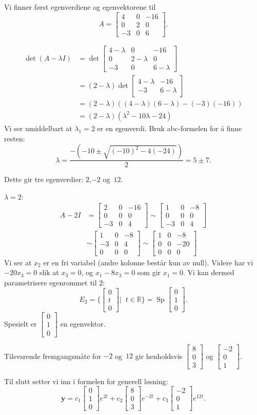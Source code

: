 \documentclass[notitlepage,a4paper,12pt,norsk]{IMFeksamen}
\DeclareMathOperator{\Sp}{Sp}
\newcommand{\V}[1]{\mathbf{#1}}
\newcommand{\vvv}[3]{\begin{bmatrix} #1 \\ #2 \\ #3 \end{bmatrix}}
\newcommand{\0}{\V{0}}
\newcommand{\oppgslutt}{
\begin{center}
\pgfornament[width=6cm]{88}
\end{center}
}
\newenvironment{losning}{\begin{oppgave}}{\oppgslutt\end{oppgave}}
\begin{document}
\begin{losning}
Vi finner først egenverdiene og egenvektorene til
\[A=
\begin{bmatrix}
4 & 0 & -16 \\
0 & 2 & 0 \\
-3 & 0 & 6
\end{bmatrix}.
\]

\begin{align*}
\det (A-\lambda I) &= \det
\begin{bmatrix}
4-\lambda & 0 & -16 \\
0 & 2-\lambda & 0 \\
-3 & 0 & 6-\lambda
\end{bmatrix}\\
&= (2-\lambda)\det
\begin{bmatrix}
4-\lambda & -16 \\
-3 &  6-\lambda
\end{bmatrix}\\
&=(2-\lambda)((4-\lambda)(6-\lambda)-(-3)(-16))\\
&=(2-\lambda)(\lambda ^2-10\lambda-24)
\end{align*}
Vi ser umiddelbart at $\lambda_1=2$ er en egenverdi. Bruk abc-formelen for å finne resten:
$$\lambda=\frac{-(-10\pm \sqrt{(-10)^2-4(-24)})}{2}=5\pm 7.$$

Dette gir tre egenverdier: $2$,$-2$ og~$12$.

\noindent 
$\lambda=2$:
\begin{align*}
A-2I &=
\begin{bmatrix}
2 & 0 & -16 \\
0 & 0 & 0 \\
-3 & 0 & 4
\end{bmatrix}
\sim
\begin{bmatrix}
1 & 0 & -8 \\
0 & 0 & 0 \\
-3 & 0 & 4
\end{bmatrix}\\
&\sim
\begin{bmatrix}
1 & 0 & -8 \\
-3 & 0 & 4 \\
0 & 0 & 0
\end{bmatrix}
\sim
\begin{bmatrix}
1 & 0 & -8 \\
0 & 0 & -20 \\
0 & 0 & 0
\end{bmatrix}
\end{align*}
Vi ser at $x_2$ er en fri variabel (andre kolonne består kun av null). Videre har vi $-20x_3=0$ slik at $x_3=0$, og $x_1-8x_3=0$ som gir $x_1=0$. Vi kan dermed parametrisere egenrommet til $2$:
$$E_2=\{\vvv{0}{t}{0}|\;\;t\in\mathbb{R}\}=\Sp \vvv{0}{1}{0}.$$ Spesielt er $\vvv{0}{1}{0}$ en egenvektor.

\noindent
Tilsvarende fremgangsmåte for $-2$ og~$12$ gir henholdsvis $\vvv{8}{0}{3}$ og $\vvv{-2}{0}{1}$.


\noindent
Til slutt setter vi inn i formelen for generell løsning:
$$\V{y} = c_1\vvv{0}{1}{0}e^{2t}+c_2\vvv{8}{0}{3}e^{-2t}+c_3 \vvv{-2}{0}{1}e^{12t}.$$
\end{losning}
\end{document}
